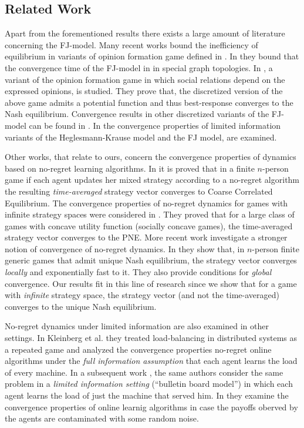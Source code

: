 \subsection{Related Work}
Apart from the forementioned results there exists a large amount 
of literature concerning the FJ-model.
Many recent works \cite{BGM13,CKO13,BFM16,EFHS17} bound the 
inefficiency of equilibrium in variants of opinion formation game 
defined in \cite{BKO11}. In \cite{GS14} they bound that the convergence 
time of the FJ-model in in special graph topologies.
In \cite{BFM16}, a variant of the opinion formation game in which social
relations depend on the expressed opinions, is studied.
They prove that, the discretized version of the above game admits
a potential function and thus best-response converges to the
Nash equilibrium. Convergence results in other discretized variants of
the FJ-model can be found in \cite{YOASS13,FGV16}. In \cite{FPS16} the convergence
properties of limited information variants of the Heglesmann-Krause model \cite{HK} 
and the FJ model, are examined.


Other works, that relate to ours, concern the convergence
properties of dynamics based on no-regret learning algorithms.
In \cite{FV97,FS99,SA00,SALS15} it is proved that in a finite $n$-person
game if each agent updates her mixed strategy according to a no-regret
algorithm the resulting \emph{time-averaged} strategy vector converges to
Coarse Correlated Equilibrium. The convergence properties of no-regret dynamics 
for games with infinite strategy spaces were considered in \cite{EMN09}.
They proved that for a large class of games with concave utility function
(socially concave games), the time-averaged strategy vector converges to
the PNE. More recent work investigate a stronger notion of convergence of
no-regret dynamics. In \cite{CHM17} they show that,
in $n$-person finite generic games that admit unique Nash equilibrium,
the strategy vector converges \emph{locally} and exponentially fast
to it. They also provide conditions for \emph{global} convergence.
Our results fit in this line of research since we show that
for a game with \emph{infinite} strategy space, the strategy vector
(and not the time-averaged) converges to the unique Nash equilibrium.

No-regret dynamics under limited information are also examined
in other settings. In Kleinberg et al. \cite{KPT09} they treated 
load-balancing in distributed systems as
a repeated game and analyzed the convergence properties
no-regret online algorithms under the \emph{full information assumption} 
that each agent learns the load of every machine. 
In a subsequent work \cite{KPT11}, the same authors consider the
same problem in a \emph{limited information setting} (\enquote{bulletin board model})
in which each agent learns the load of just the machine 
that served him. In \cite{HCM17,MS17} they examine the convergence
properties of online learnig algorithms in case the payoffs oberved 
by the agents are contaminated with some random noise. 



